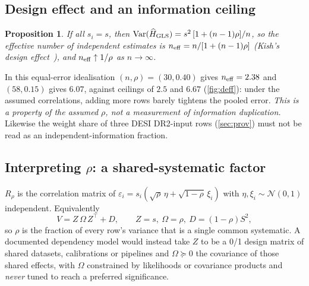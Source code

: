 \documentclass[11pt,a4paper]{article}
\newtheorem{proposition}{Proposition}
\theoremstyle{remark}\newtheorem{remark}{Remark}
\DeclareMathOperator{\Var}{Var}\DeclareMathOperator{\Cov}{Cov}\DeclareMathOperator{\Corr}{Corr}
\begin{document}
\subsection{Design effect and an information ceiling}
\begin{proposition}\label{prop:deff}
If all $s_i=s$, then $\Var(\widehat H_{\rm GLS})=s^2\,[1+(n-1)\rho]/n$, so the effective number of independent estimates is $n_{\rm eff}=n/[1+(n-1)\rho]$ (Kish's design effect~\cite{Kish1965}), and $n_{\rm eff}\uparrow1/\rho$ as $n\to\infty$.
\end{proposition}
\noindent In this equal-error idealisation $(n,\rho)=(30,0.40)$ gives $n_{\rm eff}=2.38$ and $(58,0.15)$ gives $6.07$, against ceilings of $2.5$ and $6.67$ (\cref{fig:deff}): under the assumed correlations, adding more rows barely tightens the pooled error. \emph{This is a property of the assumed $\rho$, not a measurement of information duplication.} Likewise the weight share of three DESI DR2-input rows (\cref{sec:prov}) must not be read as an independent-information fraction.

\subsection{Interpreting \texorpdfstring{$\rho$}{rho}: a shared-systematic factor}
$R_\rho$ is the correlation matrix of $\varepsilon_i=s_i(\sqrt\rho\,\eta+\sqrt{1-\rho}\,\xi_i)$ with $\eta,\xi_i\sim\mathcal N(0,1)$ independent. Equivalently
\begin{equation}
V=Z\,\Omega\,Z^{\!\top}+D,\qquad Z=s,\ \Omega=\rho,\ D=(1-\rho)S^2,
\end{equation}
so $\rho$ is the fraction of every row's variance that is a single common systematic. A documented dependency model would instead take $Z$ to be a 0/1 design matrix of shared datasets, calibrations or pipelines and $\Omega\succeq0$ the covariance of those shared effects, with $\Omega$ constrained by likelihoods or covariance products and \emph{never} tuned to reach a preferred significance.
\end{document}
